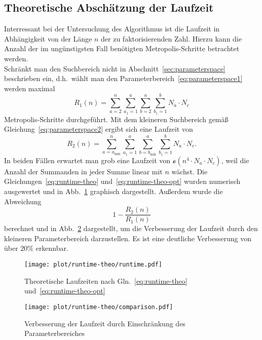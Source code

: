 \subsection{Theoretische Abschätzung der Laufzeit}\label{sec:runtime-theo}
Interressant bei der Untersuchung des Algorithmus ist die Laufzeit in Abhängigkeit von der Länge $n$ der zu faktorisierenden Zahl. Hierzu kann die Anzahl der im ungünstigsten Fall benötigten Metropolis-Schritte betrachtet werden. \\
Schränkt man den Suchbereich nicht in Abschnitt~\ref{sec:parameterspace} beschrieben ein, d.h.\ wählt man den Parameterbereich~\ref{eq:parameterspace1} werden maximal
\begin{equation*}
		R_1\left(n\right)=\sum\limits_{a=2}^{n}\sum\limits_{a_1=1}^{a}\sum\limits_{b=2}^{a}\sum\limits_{b_1=1}^{b}N_a\cdot N_c\label{eq:runtime-theo}
\end{equation*}
Metropolis-Schritte durchgeführt. Mit dem kleineren Suchbereich gemäß Gleichung~\ref{eq:parameterspace2} ergibt sich eine Laufzeit von
\begin{equation*}
		R_2\left(n\right)=\sum\limits_{a=a_\mathrm{min}}^{n}\sum\limits_{a_1=1}^{a}\sum\limits_{b=b_\mathrm{min}}^{a}\sum\limits_{b_1=1}^{b}N_a\cdot N_c\label{eq:runtime-theo-opt}.
\end{equation*}
In beiden Fällen erwartet man grob eine Laufzeit von $\mathcal{o}\left(n^4\cdot N_a\cdot N_c\right)$, weil die Anzahl der Summanden in jeder Summe linear mit $n$ wächst. Die Gleichungen~\eqref{eq:runtime-theo} und~\eqref{eq:runtime-theo-opt} wurden numerisch ausgewertet und in Abb.~\ref{fig:runtime-theo} graphisch dargestellt. Außerdem wurde die Abweichung
\begin{equation*}
		1-\frac{R_2\left(n\right)}{R_1\left(n\right)}
\end{equation*}
berechnet und in Abb.~\ref{fig:runtime-theo-comparison} dargestellt, um die Verbesserung der Laufzeit durch den kleineren Parameterbereich darzustellen. Es ist eine deutliche Verbesserung von über $20\%$ erkennbar. 
\begin{figure}[ht]
		\centering
		\texttt{[image: plot/runtime-theo/runtime.pdf]}
		\caption{Theoretische Laufzeiten nach Gln.~\eqref{eq:runtime-theo} und~\eqref{eq:runtime-theo-opt}}\label{fig:runtime-theo}
\end{figure}
\begin{figure}[ht]
		\centering
		\texttt{[image: plot/runtime-theo/comparison.pdf]}
		\caption{Verbesserung der Laufzeit durch Einschränkung des Parameterbereiches}\label{fig:runtime-theo-comparison}
\end{figure}
